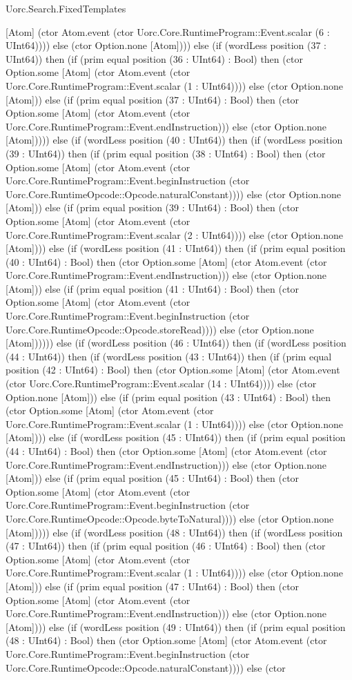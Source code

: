 \begin{lexlean}{Uorc.Search.FixedTemplates}
\begin{semanticmodule}
{[Atom] (ctor Atom.event (ctor Uorc.Core.RuntimeProgram::Event.scalar (6 : UInt64)))) else (ctor Option.none [Atom]))) else (if (wordLess position (37 : UInt64)) then (if (prim equal position (36 : UInt64) : Bool) then (ctor Option.some [Atom] (ctor Atom.event (ctor Uorc.Core.RuntimeProgram::Event.scalar (1 : UInt64)))) else (ctor Option.none [Atom])) else (if (prim equal position (37 : UInt64) : Bool) then (ctor Option.some [Atom] (ctor Atom.event (ctor Uorc.Core.RuntimeProgram::Event.endInstruction))) else (ctor Option.none [Atom])))) else (if (wordLess position (40 : UInt64)) then (if (wordLess position (39 : UInt64)) then (if (prim equal position (38 : UInt64) : Bool) then (ctor Option.some [Atom] (ctor Atom.event (ctor Uorc.Core.RuntimeProgram::Event.beginInstruction (ctor Uorc.Core.RuntimeOpcode::Opcode.naturalConstant)))) else (ctor Option.none [Atom])) else (if (prim equal position (39 : UInt64) : Bool) then (ctor Option.some [Atom] (ctor Atom.event (ctor Uorc.Core.RuntimeProgram::Event.scalar (2 : UInt64)))) else (ctor Option.none [Atom]))) else (if (wordLess position (41 : UInt64)) then (if (prim equal position (40 : UInt64) : Bool) then (ctor Option.some [Atom] (ctor Atom.event (ctor Uorc.Core.RuntimeProgram::Event.endInstruction))) else (ctor Option.none [Atom])) else (if (prim equal position (41 : UInt64) : Bool) then (ctor Option.some [Atom] (ctor Atom.event (ctor Uorc.Core.RuntimeProgram::Event.beginInstruction (ctor Uorc.Core.RuntimeOpcode::Opcode.storeRead)))) else (ctor Option.none [Atom]))))) else (if (wordLess position (46 : UInt64)) then (if (wordLess position (44 : UInt64)) then (if (wordLess position (43 : UInt64)) then (if (prim equal position (42 : UInt64) : Bool) then (ctor Option.some [Atom] (ctor Atom.event (ctor Uorc.Core.RuntimeProgram::Event.scalar (14 : UInt64)))) else (ctor Option.none [Atom])) else (if (prim equal position (43 : UInt64) : Bool) then (ctor Option.some [Atom] (ctor Atom.event (ctor Uorc.Core.RuntimeProgram::Event.scalar (1 : UInt64)))) else (ctor Option.none [Atom]))) else (if (wordLess position (45 : UInt64)) then (if (prim equal position (44 : UInt64) : Bool) then (ctor Option.some [Atom] (ctor Atom.event (ctor Uorc.Core.RuntimeProgram::Event.endInstruction))) else (ctor Option.none [Atom])) else (if (prim equal position (45 : UInt64) : Bool) then (ctor Option.some [Atom] (ctor Atom.event (ctor Uorc.Core.RuntimeProgram::Event.beginInstruction (ctor Uorc.Core.RuntimeOpcode::Opcode.byteToNatural)))) else (ctor Option.none [Atom])))) else (if (wordLess position (48 : UInt64)) then (if (wordLess position (47 : UInt64)) then (if (prim equal position (46 : UInt64) : Bool) then (ctor Option.some [Atom] (ctor Atom.event (ctor Uorc.Core.RuntimeProgram::Event.scalar (1 : UInt64)))) else (ctor Option.none [Atom])) else (if (prim equal position (47 : UInt64) : Bool) then (ctor Option.some [Atom] (ctor Atom.event (ctor Uorc.Core.RuntimeProgram::Event.endInstruction))) else (ctor Option.none [Atom]))) else (if (wordLess position (49 : UInt64)) then (if (prim equal position (48 : UInt64) : Bool) then (ctor Option.some [Atom] (ctor Atom.event (ctor Uorc.Core.RuntimeProgram::Event.beginInstruction (ctor Uorc.Core.RuntimeOpcode::Opcode.naturalConstant)))) else (ctor }
\end{semanticmodule}
\end{lexlean}
